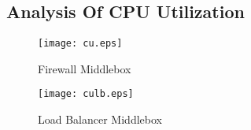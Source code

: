 \documentclass[a4paper,11pt]{report}
\begin{document}
\subsection{Analysis Of CPU Utilization}

\begin{figure}[h]
\centering
\texttt{[image: cu.eps]}
\caption{Firewall Middlebox}
\end{figure}
\begin{figure}[h]
\centering
\texttt{[image: culb.eps]}
\caption{Load Balancer Middlebox}
\end{figure}
\end{document}

